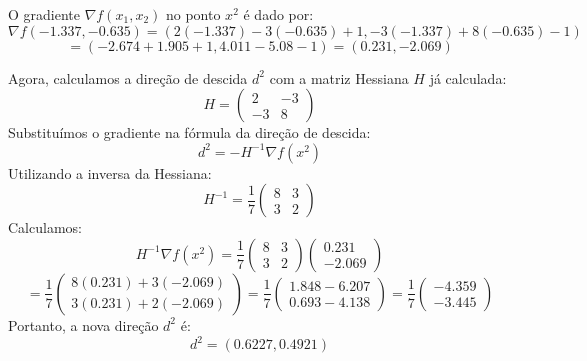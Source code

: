 \documentclass[a4paper, 12pt]{article}
\begin{document}
O gradiente \( \nabla f(x_1, x_2) \) no ponto \( x^2 \) é dado por:
\[
\nabla f(-1.337, -0.635) = \left( 2(-1.337) - 3(-0.635) + 1, -3(-1.337) + 8(-0.635) - 1 \right)
\]
\[
= (-2.674 + 1.905 + 1, 4.011 - 5.08 - 1) = (0.231, -2.069)
\]

Agora, calculamos a direção de descida \( d^2 \) com a matriz Hessiana \( H \) já calculada:
\[
H = \begin{pmatrix} 2 & -3 \\ -3 & 8 \end{pmatrix}
\]
Substituímos o gradiente na fórmula da direção de descida:
\[
d^2 = -H^{-1} \nabla f(x^2)
\]
Utilizando a inversa da Hessiana:
\[
H^{-1} = \frac{1}{7} \begin{pmatrix} 8 & 3 \\ 3 & 2 \end{pmatrix}
\]
Calculamos:
\[
H^{-1} \nabla f(x^2) = \frac{1}{7} \begin{pmatrix} 8 & 3 \\ 3 & 2 \end{pmatrix} \begin{pmatrix} 0.231 \\ -2.069 \end{pmatrix}
\]
\[
= \frac{1}{7} \begin{pmatrix} 8(0.231) + 3(-2.069) \\ 3(0.231) + 2(-2.069) \end{pmatrix} = \frac{1}{7} \begin{pmatrix} 1.848 - 6.207 \\ 0.693 - 4.138 \end{pmatrix} = \frac{1}{7} \begin{pmatrix} -4.359 \\ -3.445 \end{pmatrix}
\]
Portanto, a nova direção \( d^2 \) é:
\[
d^2 = (0.6227, 0.4921)
\]
\end{document}
